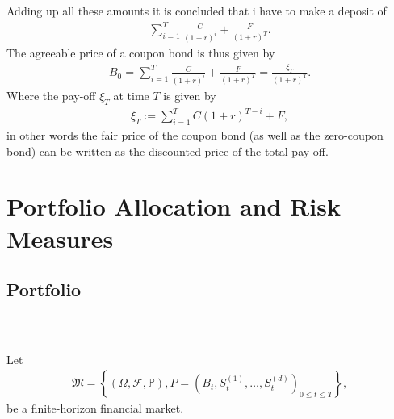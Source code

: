\documentclass{beamer}
\numberwithin{equation}{section}
\begin{document}
\begin{frame}\frametitle{{\normalsize \secname} \\ {\large \subsecname}}
    Adding up all these amounts it is concluded that i have to make a deposit of
    \begin{align}
        \sum_{i = 1}^T \frac{C}{(1 + r)^i} + \frac{F}{(1+r)^T}.
    \end{align}\pause
    The agreeable price of a coupon bond is thus given by
    \begin{align}
        B_0 = 
        \sum_{i = 1}^T \frac{C}{(1 + r)^i} + \frac{F}{(1+r)^T} =
        \frac{\xi_T}{(1 + r)^T}.
    \end{align}\pause
    Where the pay-off $\xi_T$ at time $T$ is given by
    \begin{align}
        \xi_T := \sum_{i = 1}^T C(1 + r)^{T -i} + F,
    \end{align}\pause
    in other words the fair price of the coupon bond (as well as the zero-coupon bond) can be written as the discounted price of the total pay-off.
\end{frame}

\section{Portfolio Allocation and Risk Measures}

\subsection{Portfolio}

\begin{frame}\frametitle{{\normalsize \secname} \\ {\large \subsecname}}
    Let
        \begin{align}
            \mathfrak{M} = \left\{ 
                \left(
                    \Omega, \mathscr{F}, \mathbb{P}
                \right),
                P = \left(
                    B_t, S_t^{(1)}, \ldots, S_t^{(d)}
                \right)_{0 \leq t \leq T}
            \right\},
        \end{align}
        be a finite-horizon financial market.
\end{frame}
\end{document}
